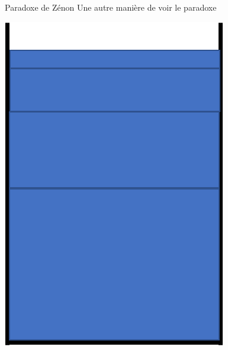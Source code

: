 \documentclass[usenames, dvipsnames]{beamer}
\begin{document}
\begin{frame}[plain]{Paradoxe de Zénon}
Une autre manière de voir le paradoxe
\begin{center}
\includegraphics[scale=0.5]{images/glass4.png}
\end{center}
\end{frame}
\end{document}
